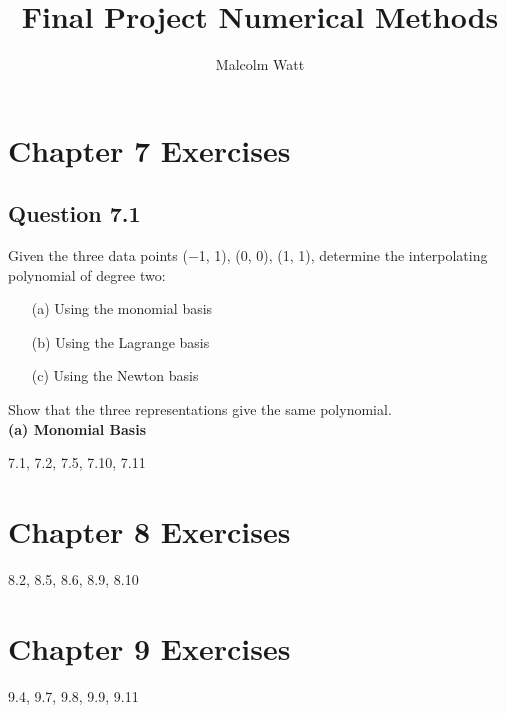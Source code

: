 \documentclass[12pt,a4paper]{report}
\author{Malcolm Watt}
\title{Final Project Numerical Methods}
\begin{document}
\maketitle

\section*{Chapter 7 Exercises}
\subsection*{Question 7.1}
Given the three data points (−1, 1), (0, 0), (1, 1), determine the interpolating
polynomial of degree two:
\begin{itemize}
\item[(a)]Using the monomial basis
\item[(b)] Using the Lagrange basis
\item[(c)] Using the Newton basis
\end{itemize}
Show that the three representations give the
same polynomial.\\

\textbf{(a) Monomial Basis\\}



7.1, 7.2, 7.5, 7.10, 7.11

\section*{Chapter 8 Exercises}
8.2, 8.5, 8.6, 8.9, 8.10

\section*{Chapter 9 Exercises}
9.4, 9.7, 9.8, 9.9, 9.11
\end{document}

